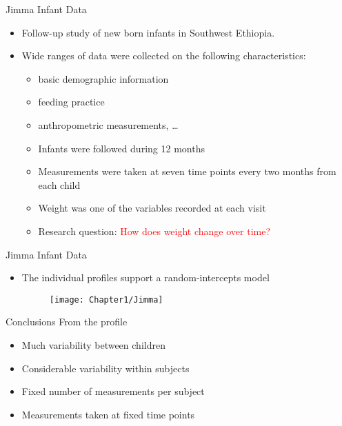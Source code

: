\documentclass{beamer}
\begin{document}
\begin{frame}{Jimma Infant Data}
\begin{itemize}
	\item Follow-up study of new born infants in Southwest Ethiopia.
	\item Wide ranges of data were collected on the following characteristics:
	\vspace*{2mm}
	\begin{itemize}
		\item basic demographic information
		\item feeding practice
		\item anthropometric measurements, \ldots
		\item Infants were followed during 12 months
		\item Measurements were taken at seven time points every two months from each child
		\item Weight was one of the variables recorded at each visit
		\item Research question: {\textcolor{red} {How does weight change over time?}}
	\end{itemize}
\end{itemize}
\end{frame}

\begin{frame}{Jimma Infant Data}
\begin{itemize}
	\item The individual profiles support a random-intercepts model
	\begin{figure}[h!]
		\centering
		\texttt{[image: Chapter1/Jimma]}
	\end{figure}
\end{itemize}
\end{frame}

\begin{frame}{Conclusions From the profile}
\begin{itemize}
	\item Much variability between children \vspace{0.25cm}
	\item Considerable variability within subjects \vspace{0.25cm}
	\item Fixed number of measurements per subject \vspace{0.25cm}
	\item Measurements taken at fixed time points
\end{itemize}
\end{frame}
\end{document}
